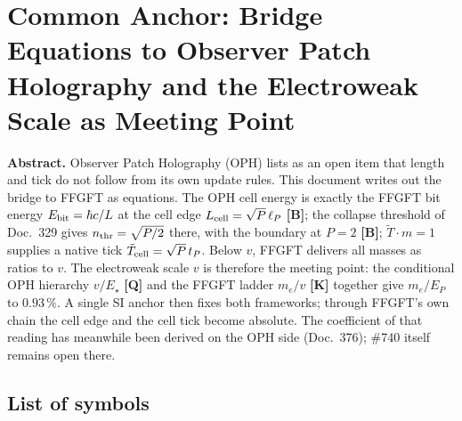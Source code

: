 \providecommand{\BM}{\textbf{[B]}}
\providecommand{\KM}{\textbf{[K]}}
\providecommand{\SM}{\textbf{[S]}}
\providecommand{\XM}{\textbf{[X]}}
\providecommand{\QM}{\textbf{[Q]}}

\chapter*{Common Anchor: Bridge Equations to Observer Patch Holography and the Electroweak Scale as Meeting Point}

{\small\noindent\textbf{Abstract.}\quad\ignorespaces
Observer Patch Holography (OPH) lists as an open item that length and tick do
not follow from its own update rules. This document writes out the bridge to
FFGFT as equations. The OPH cell energy is exactly the FFGFT bit energy
$E_{\rm bit}=\hbar c/L$ at the cell edge $L_{\rm cell}=\sqrt P\,\ell_P$ \BM; the
collapse threshold of Doc.~329 gives $n_{\rm thr}=\sqrt{P/2}$ there, with the
boundary at $P=2$ \BM; $\tilde T\cdot m=1$ supplies a native tick
$\tilde T_{\rm cell}=\sqrt P\,t_P$. Below $v$, FFGFT delivers
all masses as ratios to $v$. The electroweak scale
$v$ is therefore the meeting point: the conditional OPH hierarchy $v/E_\star$
\QM{} and the FFGFT ladder $m_e/v$ \KM{} together give $m_e/E_P$ to
$0.93\,\%$. A single SI anchor then fixes both frameworks; through FFGFT's own chain the
cell edge and the cell tick become absolute. The coefficient of that reading
has meanwhile been derived on the OPH side (Doc.~376); \#740 itself remains
open there.
}\medskip

\section*{List of symbols}

\medskip


